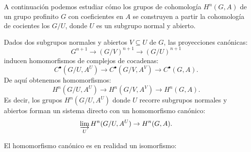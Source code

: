 \documentclass[a4paper,12pt, leqno]{article}
\begin{document}
A continuación podemos estudiar cómo los grupos de cohomología $H^n(G,A)$ de un grupo profinito $G$ con coeficientes en $A$ se construyen a partir la cohomología de cocientes los $G/U$, donde $U$ es un subgrupo normal y abierto.  

Dados dos subgrupos normales y abiertos $V\subseteq U$ de $G$, las proyecciones canónicas:
\begin{equation*}
G^{n+1}\rightarrow (G/V)^{n+1} \rightarrow (G/U)^{n+1}
\end{equation*}
inducen homomorfismos de complejos de cocadenas:
\begin{equation*}
C^{\bullet}(G/U,A^U) \rightarrow C^{\bullet}(G/V,A^V) \rightarrow C^{\bullet}(G,A).
\end{equation*}
De aquí obtenemos homomorfismos:
\begin{equation*}
H^n(G/U,A^U) \rightarrow H^n(G/V,A^V)\rightarrow H^n(G,A).
\end{equation*}
Es decir, los grupos $H^n(G/U,A^U)$ donde $U$ recorre subgrupos normales y abiertos forman un sistema directo con un homomorfismo canónico:
\begin{equation*}
\varinjlim\limits_{U} H^n(G/U,A^U) \rightarrow H^n(G,A).
\end{equation*}
\begin{prop}
El homomorfismo canónico es en realidad un isomorfismo:
\begin{center}
\end{center}
\end{prop}
\end{document}
